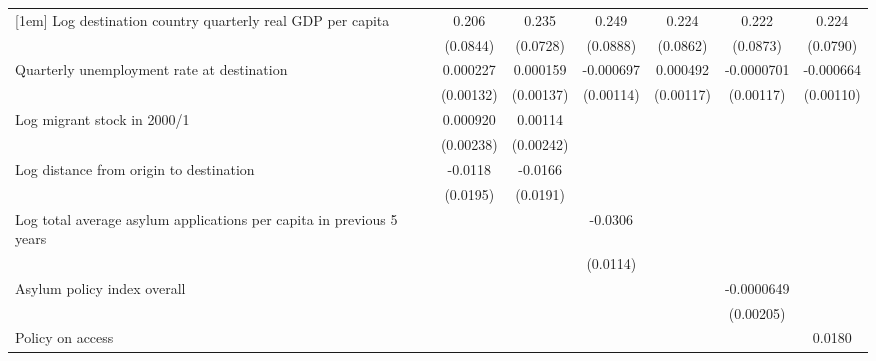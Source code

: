 \begin{table}[htbp]
\begin{tabular}{l*{6}{c}}
[1em]
Log destination country quarterly real GDP per capita&       0.206\sym{*}  &       0.235\sym{**} &       0.249\sym{**} &       0.224\sym{*}  &       0.222\sym{*}  &       0.224\sym{**} \\
                    &    (0.0844)         &    (0.0728)         &    (0.0888)         &    (0.0862)         &    (0.0873)         &    (0.0790)         \\
[1em]
Quarterly unemployment rate at destination&    0.000227         &    0.000159         &   -0.000697         &    0.000492         &  -0.0000701         &   -0.000664         \\
                    &   (0.00132)         &   (0.00137)         &   (0.00114)         &   (0.00117)         &   (0.00117)         &   (0.00110)         \\
[1em]
Log migrant stock in 2000/1&    0.000920         &     0.00114         &                     &                     &                     &                     \\
                    &   (0.00238)         &   (0.00242)         &                     &                     &                     &                     \\
[1em]
Log distance from origin to destination&     -0.0118         &     -0.0166         &                     &                     &                     &                     \\
                    &    (0.0195)         &    (0.0191)         &                     &                     &                     &                     \\
[1em]
Log total average asylum applications per capita in previous 5 years&                     &                     &     -0.0306\sym{**} &                     &                     &                     \\
                    &                     &                     &    (0.0114)         &                     &                     &                     \\
[1em]
Asylum policy index overall&                     &                     &                     &                     &  -0.0000649         &                     \\
                    &                     &                     &                     &                     &   (0.00205)         &                     \\
[1em]
Policy on access    &                     &                     &                     &                     &                     &      0.0180\sym{**} \\

\end{tabular}
\end{table}
